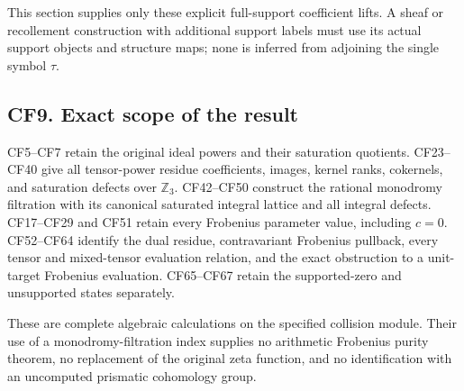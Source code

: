 This section supplies only these explicit full-support coefficient lifts. A sheaf or recollement construction with additional support labels must use its actual support objects and structure maps; none is inferred from adjoining the single symbol \(\tau\).

\subsection{CF9. Exact scope of the result}\label{cf9.-exact-scope-of-the-result}

CF5--CF7 retain the original ideal powers and their saturation quotients. CF23--CF40 give all tensor-power residue coefficients, images, kernel ranks, cokernels, and saturation defects over \(\mathbb Z_3\). CF42--CF50 construct the rational monodromy filtration with its canonical saturated integral lattice and all integral defects. CF17--CF29 and CF51 retain every Frobenius parameter value, including \(c=0\). CF52--CF64 identify the dual residue, contravariant Frobenius pullback, every tensor and mixed-tensor evaluation relation, and the exact obstruction to a unit-target Frobenius evaluation. CF65--CF67 retain the supported-zero and unsupported states separately.

These are complete algebraic calculations on the specified collision module. Their use of a monodromy-filtration index supplies no arithmetic Frobenius purity theorem, no replacement of the original zeta function, and no identification with an uncomputed prismatic cohomology group.
